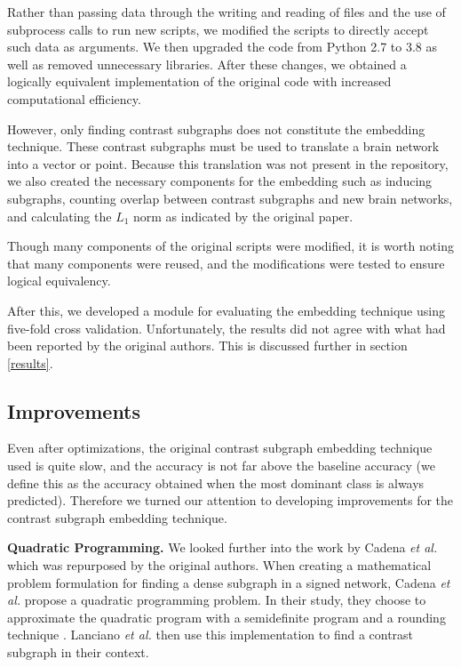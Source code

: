 \documentclass[sigconf]{acmart}
\begin{document}
Rather than passing data through the writing and reading of files and the use of subprocess calls to run new scripts, we modified the scripts to directly accept such data as arguments.
We then upgraded the code from Python 2.7 to 3.8 as well as removed unnecessary libraries.
After these changes, we obtained a logically equivalent implementation of the original code with increased computational efficiency.

However, only finding contrast subgraphs does not constitute the embedding technique.
These contrast subgraphs must be used to translate a brain network into a vector or point.
Because this translation was not present in the repository, we also created the necessary components for the embedding such as inducing subgraphs, counting overlap between contrast subgraphs and new brain networks, and calculating the $L_1$ norm as indicated by the original paper.

Though many components of the original scripts were modified, it is worth noting that many components were reused, and the modifications were tested to ensure logical equivalency.

After this, we developed a module for evaluating the embedding technique using five-fold cross validation.
Unfortunately, the results did not agree with what had been reported by the original authors.
This is discussed further in section \ref{results}.

\subsection{Improvements} \label{improvements}

Even after optimizations, the original contrast subgraph embedding technique used is quite slow, and the accuracy is not far above the baseline accuracy (we define this as the accuracy obtained when the most dominant class is always predicted).
Therefore we turned our attention to developing improvements for the contrast subgraph embedding technique.

\textbf{Quadratic Programming.}
We looked further into the work by Cadena \emph{et al.} which was repurposed by the original authors.
When creating a mathematical problem formulation for finding a dense subgraph in a signed network, Cadena \emph{et al.} propose a quadratic programming problem.
In their study, they choose to approximate the quadratic program with a semidefinite program and a rounding technique \cite{cadena2016}.
Lanciano \emph{et al.} then use this implementation to find a contrast subgraph in their context.
\end{document}
